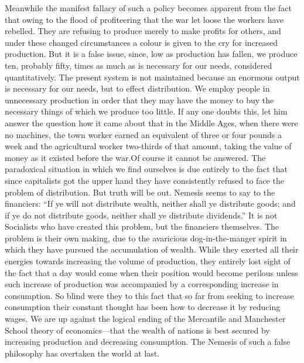 \documentclass{book}
\begin{document}
Meanwhile the manifest fallacy of such a policy becomes apparent from the fact that owing to the flood of profiteering that the war let loose the workers have rebelled. They are refusing to produce merely to make profits for others, and under these changed circumstances a colour is given to the cry for increased production. But it is a false issue, since, low as production has fallen, we produce ten, probably fifty, times as much as is necessary for our needs, considered quantitatively. The present system is not maintained because an enormous output is necessary for our needs, but to effect distribution. We employ people in unnecessary production in order that they may have the money to buy the necessary things of which we produce too little. If any one doubts this, let him answer the question how it came about that in the Middle Ages, when there were no machines, the town worker earned an equivalent of three or four pounds a week and the agricultural worker two-thirds of that amount, taking the value of money as it existed before the war.\footnotemark[5] Of course it cannot be answered. The paradoxical situation in which we find ourselves is due entirely to the fact that since capitalists got the upper hand they have consistently refused to face the problem of distribution. But truth will be out. Nemesis seems to say to the financiers: “If ye will not distribute wealth, neither shall ye distribute goods; and if ye do not distribute goods, neither shall ye distribute dividends.” It is not Socialists who have created this problem, but the financiers themselves. The problem is their own making, due to the avaricious dog-in-the-manger spirit in which they have pursued the accumulation of wealth. While they exerted all their energies towards increasing the volume of production, they entirely lost sight of the fact that a day would come when their position would become perilous unless such increase of production was accompanied by a corresponding increase in consumption. So blind were they to this fact that so far from seeking to increase consumption their constant thought has been how to decrease it by reducing wages. We are up against the logical ending of the Mercantile and Manchester School theory of economics—that the wealth of nations is best secured by increasing production and decreasing consumption. The Nemesis of such a false philosophy has overtaken the world at last.
\end{document}
